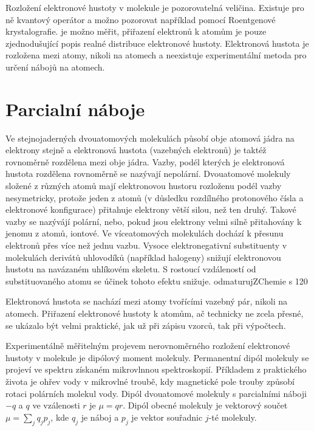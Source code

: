 \documentclass[10pt,draft,oneside]{fithesis2}
\begin{document}

Rozložení elektronové hustoty v molekule je pozorovatelná veličina. Existuje pro ně kvantový operátor a možno pozorovat například pomocí Roentgenové krystalografie. je možno měřit, přiřazení elektronů k atomům je pouze zjednodušující popis realné distribuce elektronové hustoty. Elektronová hustota je rozložena mezi atomy, nikoli na atomech a neexistuje experimentální metoda pro určení nábojů na atomech.

\chapter{Parcialní náboje}

Ve stejnojaderných dvouatomových molekulách působí obje atomová jádra na elektrony stejně a elektronová hustota (vazebných elektronů) je taktéž rovnoměrně rozdělena mezi obje jádra. Vazby, podél kterých je elektronová hustota rozdělena rovnoměrně se nazývají nepolární. Dvouatomové molekuly složené z různých atomů mají elektronovou hustoru rozloženu podél vazby nesymetricky, protože jeden z atomů (v důsledku rozdílného protonového čísla a elektronové konfigurace) přitahuje elektrony větší silou, než ten druhý. Takové vazby se nazývájí polární, nebo, pokud jsou elektrony velmi silně přitahovány k jenomu z atomů, iontové. Ve víceatomových molekulách dochází k přesunu elektronů přes více než jednu vazbu. Vysoce elektronegativní substituenty v molekulách derivátů uhlovodíků (například halogeny) snižují elektronovou hustotu na navázaném uhlíkovém skeletu. S rostoucí vzdáleností od substituovaného atomu se účinek tohoto efektu snižuje. odmaturujZChemie s 120

Elektronová hustota se nachází mezi atomy tvořícími vazebný pár, nikoli na atomech. Přiřazení elektronové hustoty k atomům, ač technicky ne zcela přesné, se ukázalo být velmi praktické, jak už při zápisu vzorců, tak při výpočtech.

Experimentálně měřitelným projevem nerovnoměrného rozložení elektronové hustoty v molekule je dipólový moment molekuly. Permanentní dipól molekuly se projeví ve spektru získaném mikrovlnnou spektroskopií. Příkladem z praktického života je ohřev vody v mikrovlné troubě, kdy magnetické pole trouby způsobí rotaci polárních molekul vody. Dipól dvouatomové molekuly s parcialními náboji $-q$ a $q$ ve vzálenosti $r$ je $\mu = qr$. Dipól obecné molekuly je vektorový součet $\mu = \sum_j q_j p_j$, kde $q_j$ je náboj a $p_j$ je vektor souřadnic $j$-té molekuly.
\end{document}
